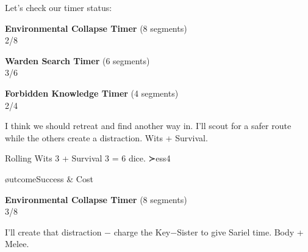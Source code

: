 \documentclass[11pt]{article}
\begin{document}
 Let's check our timer status:

\begin{center}
\textbf{Environmental Collapse Timer } (8 segments)\\
\fbox{\textcolor{timercolor}{\timersegment\timersegment}\timersegment\timersegment\timersegment\timersegment\timersegment\timersegment} 2/8
\end{center}

\begin{center}
\textbf{Warden Search Timer } (6 segments)\\
\fbox{\textcolor{timercolor}{\timersegment\timersegment\timersegment}\timersegment\timersegment\timersegment} 3/6
\end{center}

\begin{center}
\textbf{Forbidden Knowledge Timer } (4 segments)\\
\fbox{\textcolor{timercolor}{\timersegment\timersegment}\timersegment\timersegment} 2/4
\end{center}


 I think we should retreat and find another way in. I'll scout for a safer route while the others create a distraction. Wits + Survival.


 Rolling Wits 3 + Survival 3 = 6 dice.  ≻ess{4} 

øutcome{Success & Cost}



\begin{center}
\textbf{Environmental Collapse Timer } (8 segments)\\
\fbox{\textcolor{timercolor}{\timersegment\timersegment\timersegment}\timersegment\timersegment\timersegment\timersegment\timersegment} 3/8
\end{center}

 I'll create that distraction − charge the Key−Sister to give Sariel time. Body + Melee.
\end{document}
